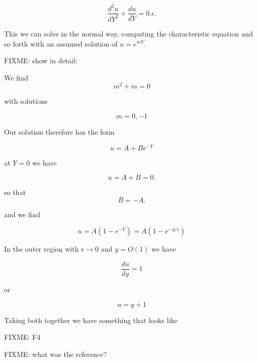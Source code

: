 \begin{equation}\label{eqn:continuumL20:n}
\frac{d^2 u}{dY^2} + \frac{du}{dY} = 0.
\epsilon.
\end{equation}

This we can solve in the normal way, computing the characteristic equation and so forth with an assumed solution of $u = e^{mY}$.

FIXME: show in detail:

We find
\begin{equation}\label{eqn:continuumL20:n}
m^2 + m = 0
\end{equation}

with solutions

\begin{equation}\label{eqn:continuumL20:n}
m = 0, -1
\end{equation}

Our solution therefore has the form

\begin{equation}\label{eqn:continuumL20:n}
u = A + B e^{-Y}
\end{equation}

at $Y = 0$ we have

\begin{equation}\label{eqn:continuumL20:n}
u = A + B = 0.
\end{equation}

so that 
\begin{equation}\label{eqn:continuumL20:n}
B = -A.
\end{equation}

and we find

\begin{equation}\label{eqn:continuumL20:n}
u = A (1 - e^{-Y}) = A( 1 - e^{-y/\epsilon} )
\end{equation}

In the outer region with $\epsilon \rightarrow 0$ and $y = O(1)$ we have

\begin{equation}\label{eqn:continuumL20:n}
\frac{du}{dy} = 1
\end{equation}

or 

\begin{equation}\label{eqn:continuumL20:n}
u = y + 1
\end{equation}

Taking both together we have something that looks like

FIXME: F4


FIXME: what was the reference?

\EndNoBibArticle
